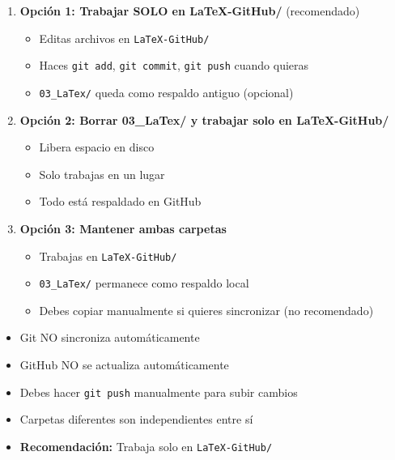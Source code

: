 \documentclass[12pt,a4paper]{article}
\begin{document}
\begin{enumerate}
  \item \textbf{Opción 1: Trabajar SOLO en LaTeX-GitHub/} (recomendado)
  \begin{itemize}
    \item Editas archivos en \texttt{LaTeX-GitHub/}
    \item Haces \texttt{git add}, \texttt{git commit}, \texttt{git push} cuando quieras
    \item \texttt{03\_LaTex/} queda como respaldo antiguo (opcional)
  \end{itemize}

  \item \textbf{Opción 2: Borrar 03\_LaTex/ y trabajar solo en LaTeX-GitHub/}
  \begin{itemize}
    \item Libera espacio en disco
    \item Solo trabajas en un lugar
    \item Todo está respaldado en GitHub
  \end{itemize}

  \item \textbf{Opción 3: Mantener ambas carpetas}
  \begin{itemize}
    \item Trabajas en \texttt{LaTeX-GitHub/}
    \item \texttt{03\_LaTex/} permanece como respaldo local
    \item Debes copiar manualmente si quieres sincronizar (no recomendado)
  \end{itemize}
\end{enumerate}

\begin{infobox}
\begin{itemize}
  \item Git NO sincroniza automáticamente
  \item GitHub NO se actualiza automáticamente
  \item Debes hacer \texttt{git push} manualmente para subir cambios
  \item Carpetas diferentes son independientes entre sí
  \item \textbf{Recomendación:} Trabaja solo en \texttt{LaTeX-GitHub/}
\end{itemize}
\end{infobox}

\end{document}
